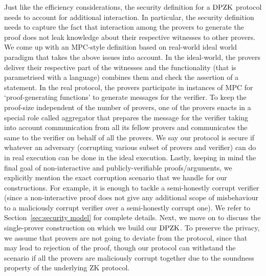 
Just like the efficiency considerations, the security definition for a $\text{DPZK}$
protocol needs to account for additional interaction. In particular, the
security definition needs to capture the fact that interaction among the provers
to generate the proof does not leak knowledge about their respective witnesses
to other provers. 
We come up with an MPC-style definition based on real-world ideal world paradigm \cite{Canetti00,Goldreich2001,Lindell17,CohenL14}  that takes the above issues into account. In the ideal-world, the provers deliver their respective part of the witnesses and the functionality (that is parametrised with a language) combines them and check the assertion of a statement. In the real protocol,  the provers participate in  instances of MPC for `proof-generating functions' to generate messages for the verifier. To  keep the proof-size  independent of the number of provers, one of the provers enacts in a special role called aggregator   that prepares the message for the verifier taking into account communication from all its fellow provers and communicates the same to the verifier on behalf of all the provers. We say our protocol is secure if whatever an adversary (corrupting various subset of provers and verifier) can do in real execution can be done in the ideal execution. Lastly, keeping in mind the final goal of non-interactive and publicly-verifiable proofs/arguments, we explicitly mention the exact corruption scenario that we handle for our constructions.  For example, it is enough to tackle a semi-honestly corrupt verifier (since a non-interactive proof does not give any additional scope of misbehaviour to a maliciously corrupt verifier  over a semi-honestly corrupt one).  We refer to Section~\ref{sec:security model} for complete details. Next, we move on to discuss the single-prover construction on which we build our $\text{DPZK}$. 
To preserve the privacy, we assume that provers are not going to deviate from the protocol, since that may lead to rejection of the proof, though our protocol can withstand the scenario if all the provers are maliciously corrupt together due to the soundness property of the underlying ZK protocol.%
